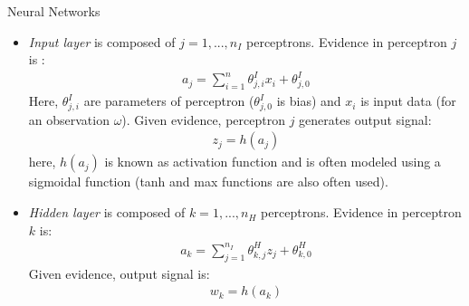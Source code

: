 \documentclass[handout,9pt]{beamer}
\begin{document}
\begin{frame}{Neural Networks}

\begin{itemize}
   \setlength{\itemsep}{5pt}
\item {\em Input layer} is composed of $j=1,...,n_I$ perceptrons. Evidence in perceptron $j$ is :
\begin{align*}
a_j=\sum_{i=1}^n\theta_{j,i}^{I}x_i+\theta_{j,0}^I
\end{align*}
Here, $\theta_{j,i}^I$ are parameters of perceptron ($\theta_{j,0}^I$ is bias) and $x_i$ is input data (for an observation $\omega$).  Given evidence, perceptron $j$ generates output signal:
\begin{align*}
z_j=h(a_j)
\end{align*}
here, $h(a_j)$ is known as activation function and is often modeled using a sigmoidal function (tanh and max functions are also often used). 
\item {\em Hidden layer} is composed of $k=1,...,n_H$ perceptrons. Evidence in perceptron $k$ is:
\begin{align*}
a_k=\sum_{j=1}^{n_I}\theta_{k,j}^{H}z_j+\theta_{k,0}^H
\end{align*}
Given evidence, output signal is:
\begin{align*}
w_k=h(a_k)
\end{align*}

\end{itemize}

\end{frame}

\end{document}
